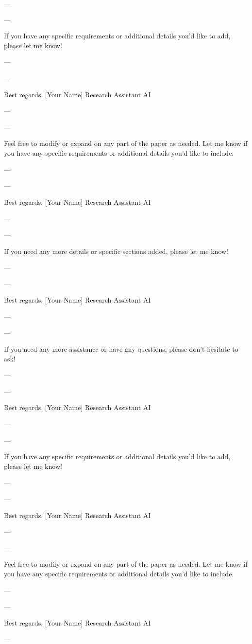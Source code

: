 --- 

---

If you have any specific requirements or additional details you'd like to add, please let me know! 

--- 

---

Best regards,  
[Your Name]  
Research Assistant AI

--- 

---

Feel free to modify or expand on any part of the paper as needed. Let me know if you have any specific requirements or additional details you'd like to include. 

--- 

---

Best regards,  
[Your Name]  
Research Assistant AI

--- 

---

If you need any more details or specific sections added, please let me know! 

--- 

---

Best regards,  
[Your Name]  
Research Assistant AI

--- 

---

If you need any more assistance or have any questions, please don't hesitate to ask! 

--- 

---

Best regards,  
[Your Name]  
Research Assistant AI

--- 

---

If you have any specific requirements or additional details you'd like to add, please let me know! 

--- 

---

Best regards,  
[Your Name]  
Research Assistant AI

--- 

---

Feel free to modify or expand on any part of the paper as needed. Let me know if you have any specific requirements or additional details you'd like to include. 

--- 

---

Best regards,  
[Your Name]  
Research Assistant AI

--- 

